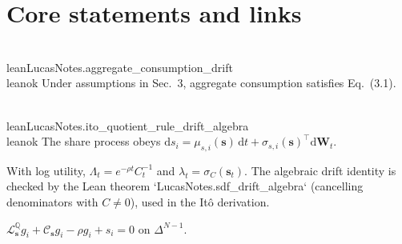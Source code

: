 
\section{Core statements and links}

\begin{lemma}\label{lem:C}
\\lean{LucasNotes.aggregate_consumption_drift}\\leanok
\uses{}
Under assumptions in Sec.~3, aggregate consumption satisfies Eq.~(3.1).
\end{lemma}

\begin{lemma}\label{lem:s}
\\lean{LucasNotes.ito_quotient_rule_drift_algebra}\\leanok %
The share process obeys $\mathrm{d}s_i=\mu_{s,i}(\mathbf s)\,\mathrm{d}t+\sigma_{s,i}(\mathbf s)^\top \mathrm{d}\mathbf W_t$.
\end{lemma}

\begin{proposition}[SDF]\label{prop:sdf}
\leanok
{}
With log utility, $\Lambda_t=e^{-\rho t} C_t^{-1}$ and $\lambda_t=\sigma_C(\mathbf s_t)$. The algebraic drift identity is checked by
the Lean theorem `LucasNotes.sdf_drift_algebra` (cancelling denominators with $C\neq 0$), used in the It\^o derivation.
\end{proposition}

\begin{theorem}\label{thm:valuation_pde_reduced}
\leanok
{}
$\mathcal L^{\mathbb Q}_{\mathbf s} g_i + \mathcal C_{\mathbf s} g_i - \rho g_i + s_i = 0$ on $\Delta^{N-1}$.
\end{theorem}
